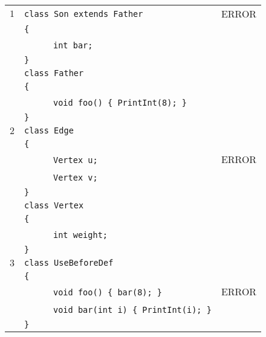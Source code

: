 \documentclass{article}
\begin{document}
\begin{table}[h]
\centering
\begin{tabular}{|l|l|l|}
\hline
 $1$ & \verb"class Son extends Father"           & ERROR \\
     & \verb"{"                                  &       \\
     & ~ ~ ~ ~\verb"int bar;"                    &       \\
     & \verb"}"                                  &       \\
     & \verb"class Father"                       &       \\
     & \verb"{"                                  &       \\
     & ~ ~ ~ ~\verb"void foo() { PrintInt(8); }" &       \\
     & \verb"}"                                  &       \\
\hline
 $2$ & \verb"class Edge"                         &       \\
     & \verb"{"                                  &       \\
     & ~ ~ ~ ~\verb"Vertex u;"                   & ERROR \\
     & ~ ~ ~ ~\verb"Vertex v;"                   &       \\
     & \verb"}"                                  &       \\
     & \verb"class Vertex"                       &       \\
     & \verb"{"                                  &       \\
     & ~ ~ ~ ~\verb"int weight;"                 &       \\
     & \verb"}"                                  &       \\
\hline
 $3$ & \verb"class UseBeforeDef"                      &    \\
     & \verb"{"                                       &    \\
     & ~ ~ ~ ~\verb"void foo() { bar(8); }"           & ERROR \\
     & ~ ~ ~ ~\verb"void bar(int i) { PrintInt(i); }" &    \\
     & \verb"}"                                       &    \\

\end{tabular}
\end{table}
\end{document}

